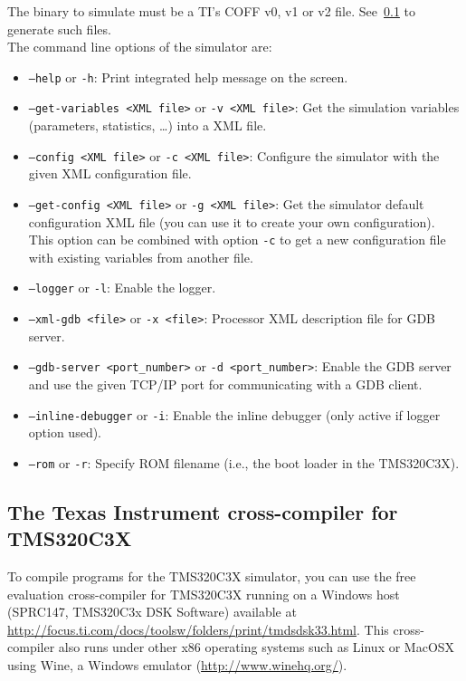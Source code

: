 \noindent The binary to simulate must be a TI's COFF v0, v1 or v2 file. See~\ref{tms320c3x_cross_compiler} to generate such files.
\newline\\
\noindent The command line options of the simulator are:

\begin{itemize}
\item \texttt{--help} or \texttt{-h}: Print integrated help message on the screen.
\item \texttt{--get-variables <XML file>} or \texttt{-v <XML file>}: Get the simulation variables (parameters, statistics, \ldots) into a XML file.
\item \texttt{--config <XML file>} or \texttt{-c <XML file>}: Configure the simulator with the given XML configuration file.
\item \texttt{--get-config <XML file>} or \texttt{-g <XML file>}: Get the simulator default configuration XML file (you can use it to create your own configuration). This option can be combined with option \texttt{-c} to get a new configuration file with existing variables from another file.
\item \texttt{--logger} or \texttt{-l}: Enable the logger.
\item \texttt{--xml-gdb <file>} or \texttt{-x <file>}: Processor XML description file for GDB server.
\item \texttt{--gdb-server <port\_number>} or \texttt{-d <port\_number>}: Enable the GDB server and use the given TCP/IP port for communicating with a GDB client.
\item \texttt{--inline-debugger} or \texttt{-i}: Enable the inline debugger (only active if logger option used).
\item \texttt{--rom} or \texttt{-r}: Specify ROM filename (i.e., the boot loader in the TMS320C3X).
\end{itemize}

\subsection{The Texas Instrument cross-compiler for TMS320C3X}
\label{tms320c3x_cross_compiler}

To compile programs for the TMS320C3X simulator, you can use the free evaluation cross-compiler for TMS320C3X running on a Windows host (SPRC147, TMS320C3x DSK Software) available at \url{http://focus.ti.com/docs/toolsw/folders/print/tmdsdsk33.html}.
This cross-compiler also runs under other x86 operating systems such as Linux or MacOSX using Wine, a Windows emulator (\url{http://www.winehq.org/}).


